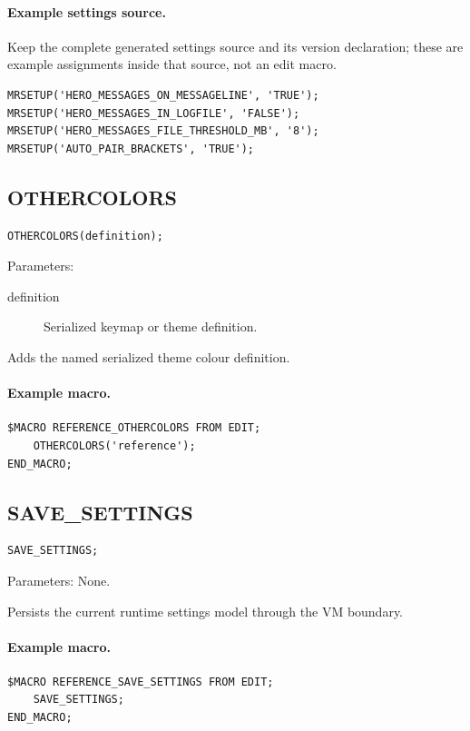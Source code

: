 \documentclass[a4paper,10pt,twoside,openany]{book}
\newenvironment{mrmacextension}{\begin{changebar}}{\end{changebar}}
\begin{document}
\begin{mrmacextension}
\paragraph{Example settings source.}
Keep the complete generated settings source and its version declaration;
these are example assignments inside that source, not an edit macro.
\begin{verbatim}
MRSETUP('HERO_MESSAGES_ON_MESSAGELINE', 'TRUE');
MRSETUP('HERO_MESSAGES_IN_LOGFILE', 'FALSE');
MRSETUP('HERO_MESSAGES_FILE_THRESHOLD_MB', '8');
MRSETUP('AUTO_PAIR_BRACKETS', 'TRUE');
\end{verbatim}
\end{mrmacextension}

\begin{mrmacextension}
\label{prim:procedure-othercolors}
\subsection*{OTHERCOLORS}
\begin{verbatim}
OTHERCOLORS(definition);
\end{verbatim}
Parameters:
\begin{description}
\item[definition] Serialized keymap or theme definition.
\end{description}

Adds the named serialized theme colour definition.

\paragraph{Example macro.}
\begin{verbatim}
$MACRO REFERENCE_OTHERCOLORS FROM EDIT;
    OTHERCOLORS('reference');
END_MACRO;
\end{verbatim}
\end{mrmacextension}

\begin{mrmacextension}
\label{prim:procedure-save-settings}
\subsection*{SAVE\_SETTINGS}
\begin{verbatim}
SAVE_SETTINGS;
\end{verbatim}
Parameters: None.

Persists the current runtime settings model through the VM boundary.

\paragraph{Example macro.}
\begin{verbatim}
$MACRO REFERENCE_SAVE_SETTINGS FROM EDIT;
    SAVE_SETTINGS;
END_MACRO;
\end{verbatim}
\end{mrmacextension}
\end{document}
